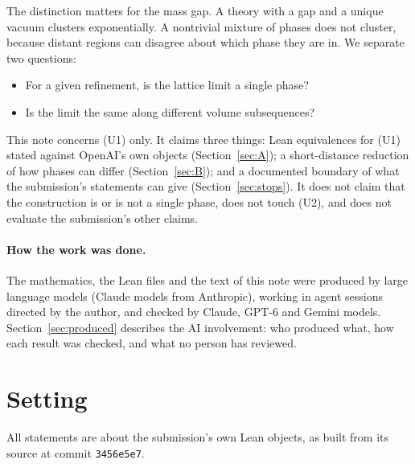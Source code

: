 \documentclass[11pt,a4paper]{article}
\theoremstyle{plain}
\begin{document}
The distinction matters for the mass gap. A theory with a gap and a unique vacuum clusters exponentially. A nontrivial mixture of phases does not cluster, because distant regions can disagree about which phase they are in. We separate two questions:
\begin{itemize}
\item[\textbf{(U1)}] For a given refinement, is the lattice limit a single phase?
\item[\textbf{(U2)}] Is the limit the same along different volume subsequences?
\end{itemize}
This note concerns (U1) only. It claims three things: Lean equivalences for (U1) stated against OpenAI's own objects (Section~\ref{sec:A}); a short-distance reduction of how phases can differ (Section~\ref{sec:B}); and a documented boundary of what the submission's statements can give (Section~\ref{sec:stops}). It does not claim that the construction is or is not a single phase, does not touch (U2), and does not evaluate the submission's other claims.

\paragraph{How the work was done.} The mathematics, the Lean files and the text of this note were produced by large language models (Claude models from Anthropic), working in agent sessions directed by the author, and checked by Claude, GPT-6 and Gemini models. Section~\ref{sec:produced} describes the AI involvement: who produced what, how each result was checked, and what no person has reviewed.

\section{Setting}\label{sec:setting}

All statements are about the submission's own Lean objects, as built from its source at commit \texttt{3456e5e7}.
\end{document}
